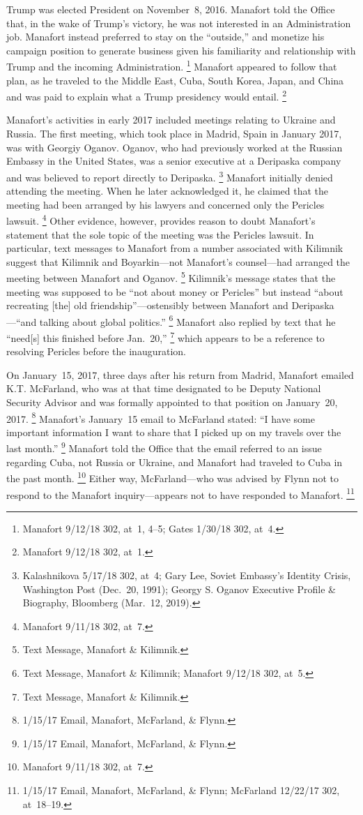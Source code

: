 Trump was elected President on November~8, 2016.
Manafort told the Office that, in the wake of Trump's victory, he was not interested in an Administration job.
Manafort instead preferred to stay on the ``outside,'' and monetize his campaign position to generate business given his familiarity and relationship with Trump and the incoming Administration.%
\footnote{Manafort 9/12/18 302, at~1, 4--5;
Gates 1/30/18 302, at~4.}
Manafort appeared to follow that plan, as he traveled to the Middle East, Cuba, South Korea, Japan, and China and was paid to explain what a Trump presidency would entail.%
\footnote{Manafort 9/12/18 302, at~1.}

Manafort's activities in early 2017 included meetings relating to Ukraine and Russia.
The first meeting, which took place in Madrid, Spain in January 2017, was with Georgiy Oganov.
Oganov, who had previously worked at the Russian Embassy in the United States, was a senior executive at a Deripaska company and was believed to report directly to Deripaska.%
\footnote{Kalashnikova 5/17/18 302, at~4;
Gary Lee, Soviet Embassy's Identity Crisis, Washington Post (Dec.~20, 1991);
Georgy S. Oganov Executive Profile \& Biography, Bloomberg (Mar.~12, 2019).}
Manafort initially denied attending the meeting.
When he later acknowledged it, he claimed that the meeting had been arranged by his lawyers and concerned only the Pericles lawsuit.%
\footnote{Manafort 9/11/18 302, at~7.}
Other evidence, however, provides reason to doubt Manafort's statement that the sole topic of the meeting was the Pericles lawsuit.
In particular, text messages to Manafort from a number associated with Kilimnik suggest that Kilimnik and Boyarkin---not Manafort's counsel---had arranged the meeting between Manafort and Oganov.%
\footnote{Text Message, Manafort \& Kilimnik.}
Kilimnik's message states that the meeting was supposed to be ``not about money or Pericles'' but instead ``about recreating [the] old friendship''---ostensibly between Manafort and Deripaska---``and talking about global politics.''%
\footnote{Text Message, Manafort \& Kilimnik;
Manafort 9/12/18 302, at~5.}
Manafort also replied by text that he ``need[s] this finished before Jan.~20,''%
\footnote{Text Message, Manafort \& Kilimnik.}
which appears to be a reference to resolving Pericles before the inauguration.

On January~15, 2017, three days after his return from Madrid, Manafort emailed K.T. McFarland, who was at that time designated to be Deputy National Security Advisor and was formally appointed to that position on January~20, 2017.%
\footnote{1/15/17 Email, Manafort, McFarland, \& Flynn.}
Manafort's January~15 email to McFarland stated: ``I have some important information I want to share that I picked up on my travels over the last month.''%
\footnote{1/15/17 Email, Manafort, McFarland, \& Flynn.}
Manafort told the Office that the email referred to an issue regarding Cuba, not Russia or Ukraine, and Manafort had traveled to Cuba in the past month.%
\footnote{Manafort 9/11/18 302, at~7.}
Either way, McFarland---who was advised by Flynn not to respond to the Manafort inquiry---appears not to have responded to Manafort.%
\footnote{1/15/17 Email, Manafort, McFarland, \& Flynn;
McFarland 12/22/17 302, at~18--19.}

